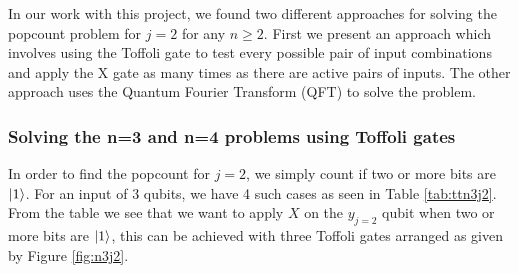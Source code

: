 \documentclass[12pt,a4paper]{article}
\begin{document}
In our work with this project, we found two different approaches for solving the popcount problem for \(j=2\) for any \(n \ge 2\). First we present an approach which involves using the Toffoli gate to test every possible pair of input combinations and apply the X gate as many times as there are active pairs of inputs. The other approach uses the Quantum Fourier Transform (QFT) to solve the problem. 

\subsubsection{Solving the n=3 and n=4 problems using Toffoli gates}
\label{sec:ET solutions to j=2}
In order to find the popcount for \(j = 2\), we simply count if two or more bits are $\ket{1}$. For an input of 3 qubits, we have 4 such cases as seen in Table \ref{tab:ttn3j2}. From the table we see that we want to apply \(X\) on the \(y_{j=2}\) qubit when two or more bits are $\ket{1}$, this can be achieved with three Toffoli gates arranged as given by Figure \ref{fig:n3j2}.
\end{document}
